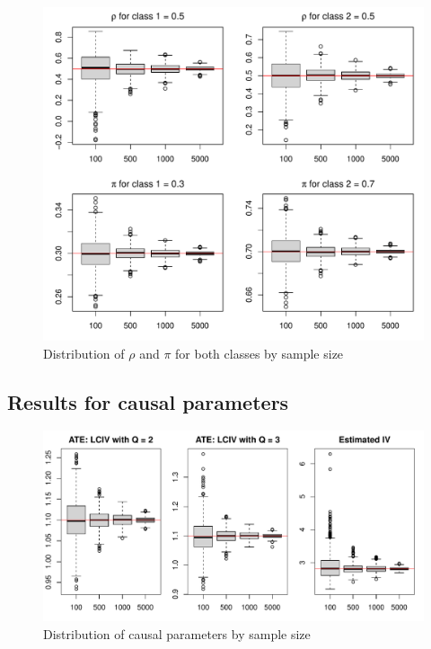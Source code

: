\documentclass[12pt]{article}\usepackage[]{graphicx}\usepackage[]{xcolor}
\makeatletter
\def\maxwidth{ %
  \ifdim\Gin@nat@width>\linewidth
    \linewidth
  \else
    \Gin@nat@width
  \fi
}
\newenvironment{knitrout}{}{} %
\makeatother
\begin{document}
\begin{figure}[H]
 \caption{Distribution of $\rho$  and $\pi$ for both classes by sample size}
 \centering
\begin{knitrout}
\color{fgcolor}
\includegraphics[width=\maxwidth]{figure/fig2a-1} 
\end{knitrout}
\end{figure}

\subsection{Results for causal parameters}

\begin{figure}[H]
 \caption{Distribution of causal parameters by sample size}
 \centering
\begin{knitrout}
\color{fgcolor}
\includegraphics[width=\maxwidth]{figure/fig3a-1} 
\end{knitrout}
\end{figure}
\end{document}
